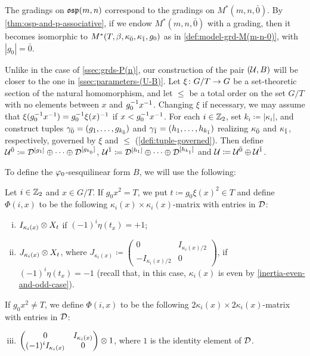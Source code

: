 The gradings on $\mathfrak{osp}(m,n)$ correspond to the gradings on $M^*(m, n, \bar 0)$. 
By \cref{thm:osp-and-p-associative}, if we endow $M^*(m, n, \bar 0)$ with a grading, then it becomes isomorphic to $M^*(T, \beta, \kappa_{\bar{0}}, \kappa_{\bar{1}}, g_0)$ as in \cref{def:model-grd-M(m-n-0)}, with $|g_0| = \bar 0$. 

Unlike in the case of \cref{ssec:grds-P(n)}, our construction of the pair $(\mathcal U, B)$ will be closer to the one in \cref{ssec:parameters-(U-B)}. 
Let $\xi\colon G/T \to G$ be a set-theoretic section of the natural homomorphism, and let $\leq$ be a total order on the set $G/T$ with no elements between $x$ and $g_0^{-1} x^{-1}$. 
Changing $\xi$ if necessary, we may assume that $\xi(g_0^{-1} x^{-1}) = g_0^{-1} \xi(x)^{-1}$ if $x < g_0^{-1} x^{-1}$. 
For each $i \in \mathbb{Z}_2$, set $k_i \coloneqq |\kappa_i|$, and construct tuples $\gamma_{\bar{0}} = (g_1, \ldots, g_{k_{\bar{0}}})$ and $\gamma_{\bar{1}} = (h_1, \ldots, h_{k_{\bar{1}}})$ realizing $\kappa_{\bar{0}}$ and $\kappa_{\bar{1}}$, respectively, governed by $\xi$ and $\leq$ (\cref{defi:tuple-governed}). 
Then define $\mathcal U^{\bar0} \coloneqq \mathcal{D}^{[g_1]} \oplus \cdots \oplus \mathcal{D}^{[g_{k_{\bar{0}}}]}$, $\mathcal U^{\bar1} \coloneqq \mathcal{D}^{[h_1]} \oplus \cdots \oplus \mathcal{D}^{[h_{k_{\bar{1}}}]}$ and $\mathcal U \coloneqq \mathcal U^{\bar0} \oplus \mathcal U^{\bar1}$. 

To define the $\varphi_0$-sesquilinear form $B$, we will use the following:

\begin{defi}\label{defi:blocks-of-Phi}
    Let $i\in \mathbb{Z}_2$ and $x \in G/T$. 
    If $g_0x^2 = T$, we put $t \coloneqq g_0 \xi(x)^2 \in T$ and define $\Phi(i, x)$ to be the following $\kappa_i(x) \times \kappa_i(x)$-matrix with entries in $\mathcal{D}$:
    \begin{enumerate}[(i)]
        \item $I_{\kappa_i(x)} \otimes X_{t}$ if $(-1)^i \eta(t_x) = +1$;
		\item  $J_{\kappa_i(x)} \otimes X_{t}$, where $J_{\kappa_i(x)} \coloneqq \begin{pmatrix}
				      0                & I_{\kappa_i(x)/2} \\
				      -I_{\kappa_i(x)/2} & 0
			      \end{pmatrix}$, if  $(-1)^i \eta(t_x) = -1$ (recall that, in this case, $\kappa_i(x)$ is even by \cref{inertia-even-and-odd-case}). 
	\end{enumerate}
    If $g_0 x^2 \neq T$, we define $\Phi(i, x)$ to be the following $2\kappa_i(x) \times 2\kappa_i(x)$-matrix with entries in $\mathcal{D}$:
    \begin{enumerate}[(i)]
        \setcounter{enumi}{2}
		\item $\begin{pmatrix}
			0                                                  & I_{\kappa_i(x)} \\
			(-1)^{i} I_{\kappa_i(x)} & 0
		\end{pmatrix} \otimes 1$, where $1$ is the identity element of $\mathcal{D}$. 
    \end{enumerate}
\end{defi}

